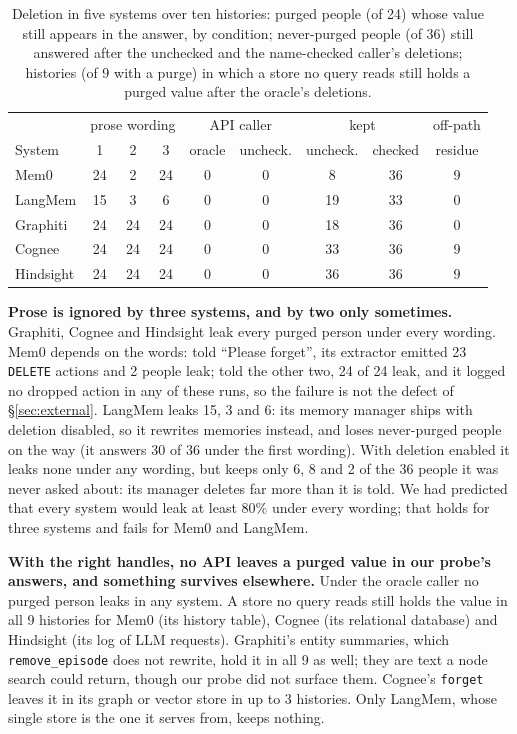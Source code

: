 \documentclass[conference]{IEEEtran}
\begin{document}
\begin{table}[t]
\centering
\caption{Deletion in five systems over ten histories: purged people (of 24)
whose value still appears in the answer, by condition; never-purged people (of
36) still answered after the unchecked and the name-checked caller's deletions;
histories (of 9 with a purge) in which a store no query reads still holds a
purged value after the oracle's deletions.}
\label{tab:deletion}
\footnotesize
\setlength{\tabcolsep}{2.6pt}
\begin{tabular}{@{}lcccccccc@{}}
\toprule
 & \multicolumn{3}{c}{prose wording} & \multicolumn{2}{c}{API caller} & \multicolumn{2}{c}{kept} & off-path \\
System & 1 & 2 & 3 & oracle & uncheck. & uncheck. & checked & residue \\
\midrule
Mem0      & 24 & 2  & 24 & 0 & 0 & 8  & 36 & 9 \\
LangMem   & 15 & 3  & 6  & 0 & 0 & 19 & 33 & 0 \\
Graphiti  & 24 & 24 & 24 & 0 & 0 & 18 & 36 & 0 \\
Cognee    & 24 & 24 & 24 & 0 & 0 & 33 & 36 & 9 \\
Hindsight & 24 & 24 & 24 & 0 & 0 & 36 & 36 & 9 \\
\bottomrule
\end{tabular}
\end{table}

\textbf{Prose is ignored by three systems, and by two only sometimes.} Graphiti,
Cognee and Hindsight leak every purged person under every wording. Mem0 depends
on the words: told ``Please forget'', its extractor emitted 23 \texttt{DELETE}
actions and 2 people leak; told the other two, 24 of 24 leak, and it logged no
dropped action in any of these runs, so the failure is not the defect of
\S\ref{sec:external}. LangMem leaks 15, 3 and 6: its memory manager ships with
deletion disabled, so it rewrites memories instead, and loses never-purged
people on the way (it answers 30 of 36 under the first wording). With deletion
enabled it leaks none under any wording, but keeps only 6, 8 and 2 of the 36
people it was never asked about: its manager deletes far more than it is told. We had
predicted that every system would leak at least 80\% under every wording; that
holds for three systems and fails for Mem0 and LangMem.

\textbf{With the right handles, no API leaves a purged value in our probe's
answers, and something survives elsewhere.} Under the oracle caller no purged person leaks in
any system. A store no query reads still holds the value in all 9 histories for
Mem0 (its history table), Cognee (its relational database) and Hindsight (its
log of LLM requests). Graphiti's entity summaries, which \texttt{remove\_episode}
does not rewrite, hold it in all 9 as well; they are text a node search could
return, though our probe did not surface them. Cognee's \texttt{forget} leaves it
in its graph or vector store in up to 3 histories. Only LangMem, whose single
store is the one it serves from, keeps nothing.
\end{document}
